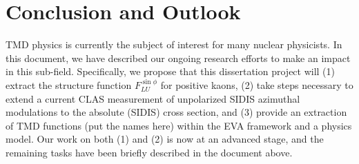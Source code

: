 \section{Conclusion and Outlook}
TMD physics is currently the subject of interest for many nuclear physicists.  In this document, we have described our ongoing research efforts to make an impact in this sub-field.  Specifically, we propose that this dissertation project will (1) extract the structure function $F_{LU}^{\sin\phi}$ for positive kaons, (2) take steps necessary to extend a current CLAS measurement of unpolarized SIDIS azimuthal modulations to the absolute (SIDIS) cross section, and (3) provide an extraction of TMD functions (put the names here) within the EVA framework and a physics model.  Our work on both (1) and (2) is now at an advanced stage, and the remaining tasks have been briefly described in the document above.  

